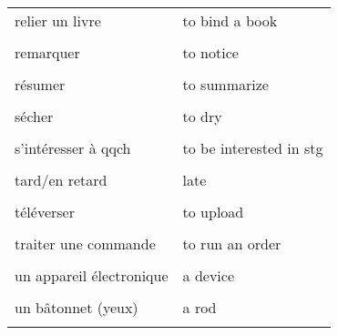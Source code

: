 \documentclass[
  10pt,
]{article}
\begin{document}
\begin{longtable}{ll}
relier un livre & to bind a book\\

\cellcolor{gray!6}{reliure spirales} & \cellcolor{gray!6}{coil binding}\\

remarquer & to notice\\

\cellcolor{gray!6}{réparer} & \cellcolor{gray!6}{to fix}\\

résumer & to summarize\\

\cellcolor{gray!6}{rugueux} & \cellcolor{gray!6}{rough}\\

sécher & to dry\\

\cellcolor{gray!6}{se débarrasser de qqch} & \cellcolor{gray!6}{to get rid of stg}\\

s'intéresser à qqch & to be interested in stg\\

\cellcolor{gray!6}{suivant} & \cellcolor{gray!6}{next}\\

tard/en retard & late\\

\cellcolor{gray!6}{télécharger} & \cellcolor{gray!6}{to download}\\

téléverser & to upload\\

\cellcolor{gray!6}{traiter de} & \cellcolor{gray!6}{to deal with (dealt x 2)}\\

traiter une commande & to run an order\\

\cellcolor{gray!6}{travailleur} & \cellcolor{gray!6}{hard-working}\\

un appareil électronique & a device\\

\cellcolor{gray!6}{un autocollant} & \cellcolor{gray!6}{a sticker}\\

un bâtonnet (yeux) & a rod\\

\cellcolor{gray!6}{un blanchet} & \cellcolor{gray!6}{un blanket}\\


\end{longtable}
\end{document}
